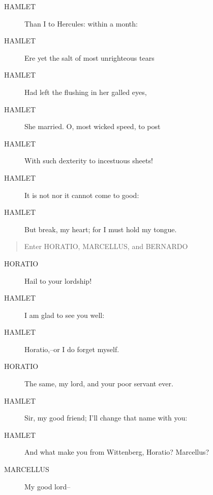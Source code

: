 \documentclass{article}
\begin{document}
\begin{description}
\item[HAMLET] Than I to Hercules: within a month:
\item[HAMLET] Ere yet the salt of most unrighteous tears
\item[HAMLET] Had left the flushing in her galled eyes,
\item[HAMLET] She married. O, most wicked speed, to post
\item[HAMLET] With such dexterity to incestuous sheets!
\item[HAMLET] It is not nor it cannot come to good:
\item[HAMLET] But break, my heart; for I must hold my tongue.
\end{description}
          
\begin{quote}
Enter HORATIO, MARCELLUS, and BERNARDO
\end{quote}
          
\begin{description}
            
\item[HORATIO] Hail to your lordship!
\end{description}
          
\begin{description}
            
\item[HAMLET] I am glad to see you well:
\item[HAMLET] Horatio,--or I do forget myself.
\end{description}
          
\begin{description}
            
\item[HORATIO] The same, my lord, and your poor servant ever.
\end{description}
          
\begin{description}
            
\item[HAMLET] Sir, my good friend; I'll change that name with you:
\item[HAMLET] And what make you from Wittenberg, Horatio? Marcellus?
\end{description}
          
\begin{description}
            
\item[MARCELLUS] My good lord--
\end{description}
          
\end{document}
